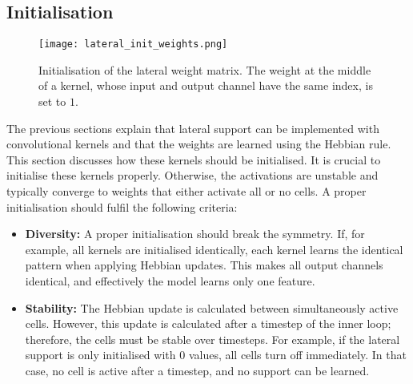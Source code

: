 

\subsection{Initialisation}
\begin{figure}[h]
    \centering
    \texttt{[image: lateral\_init\_weights.png]}
    \caption[Initialisation of the lateral weight matrix]{Initialisation of the lateral weight matrix. The weight at the middle of a kernel, whose input and output channel have the same index, is set to $1$.}
\end{figure}
The previous sections explain that lateral support can be implemented with convolutional kernels and that the weights are learned using the Hebbian rule.
This section discusses how these kernels should be initialised.
It is crucial to initialise these kernels properly. Otherwise, the activations are unstable and typically converge to weights that either activate all or no cells.
A proper initialisation should fulfil the following criteria:

\begin{itemize}
    \item \textbf{Diversity:} A proper initialisation should break the symmetry. If, for example, all kernels are initialised identically, each kernel learns the identical pattern when applying Hebbian updates. This makes all output channels identical, and effectively the model learns only one feature.
    \item \textbf{Stability:} The Hebbian update is calculated between simultaneously active cells. However, this update is calculated after a timestep of the inner loop; therefore, the cells must be stable over timesteps. For example, if the lateral support is only initialised with $0$ values, all cells turn off immediately. In that case, no cell is active after a timestep, and no support can be learned.
\end{itemize}

